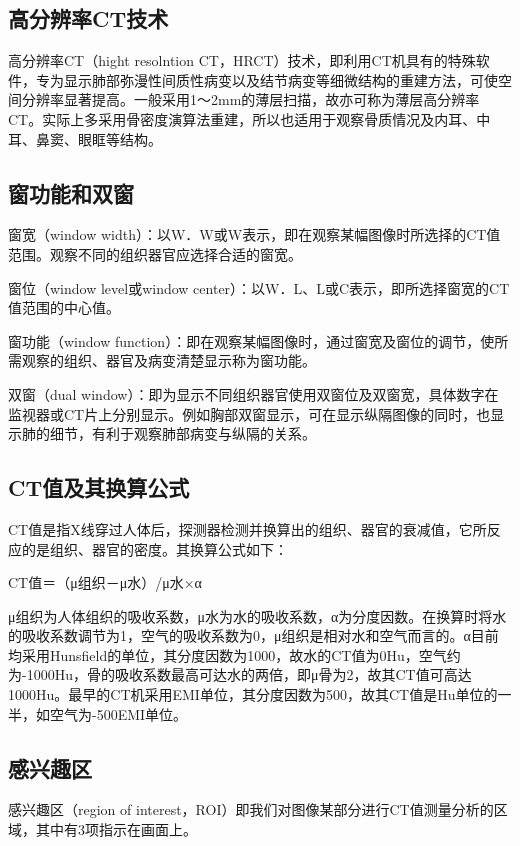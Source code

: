 \subsection{高分辨率CT技术}

高分辨率CT（hight resolntion
CT，HRCT）技术，即利用CT机具有的特殊软件，专为显示肺部弥漫性间质性病变以及结节病变等细微结构的重建方法，可使空间分辨率显著提高。一般采用1～2mm的薄层扫描，故亦可称为薄层高分辨率CT。实际上多采用骨密度演算法重建，所以也适用于观察骨质情况及内耳、中耳、鼻窦、眼眶等结构。

\subsection{窗功能和双窗}

窗宽（window
width）：以W．W或W表示，即在观察某幅图像时所选择的CT值范围。观察不同的组织器官应选择合适的窗宽。

窗位（window level或window
center）：以W．L、L或C表示，即所选择窗宽的CT值范围的中心值。

窗功能（window
function）：即在观察某幅图像时，通过窗宽及窗位的调节，使所需观察的组织、器官及病变清楚显示称为窗功能。

双窗（dual
window）：即为显示不同组织器官使用双窗位及双窗宽，具体数字在监视器或CT片上分别显示。例如胸部双窗显示，可在显示纵隔图像的同时，也显示肺的细节，有利于观察肺部病变与纵隔的关系。

\subsection{CT值及其换算公式}

CT值是指X线穿过人体后，探测器检测并换算出的组织、器官的衰减值，它所反应的是组织、器官的密度。其换算公式如下：

CT值＝（μ组织－μ水）/μ水×α

μ组织为人体组织的吸收系数，μ水为水的吸收系数，α为分度因数。在换算时将水的吸收系数调节为1，空气的吸收系数为0，μ组织是相对水和空气而言的。α目前均采用Hunsfield的单位，其分度因数为1000，故水的CT值为0Hu，空气约为-1000Hu，骨的吸收系数最高可达水的两倍，即μ骨为2，故其CT值可高达1000Hu。最早的CT机采用EMI单位，其分度因数为500，故其CT值是Hu单位的一半，如空气为-500EMI单位。

\subsection{感兴趣区}

感兴趣区（region of
interest，ROI）即我们对图像某部分进行CT值测量分析的区域，其中有3项指示在画面上。

